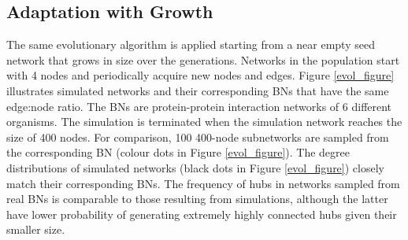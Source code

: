 \subsection{Adaptation with Growth}\label{evolution_results}
	The same evolutionary algorithm is applied starting from a near empty seed network that grows in size
	over the generations. Networks in the population start with 4 nodes and periodically acquire new nodes 
	and edges. Figure \ref{evol_figure} illustrates simulated networks and their corresponding
	BNs that have the same edge:node ratio. The BNs are protein-protein interaction networks of 6 different organisms. The simulation is terminated when the simulation network
	reaches the size of 400 nodes. For comparison, 
	 100 400-node subnetworks are sampled from the corresponding BN (colour dots in Figure \ref{evol_figure}). 
	 The degree distributions of simulated networks (black dots in Figure \ref{evol_figure})
	closely match their corresponding BNs. 
	The frequency of hubs in  networks sampled from real BNs is comparable to those resulting from simulations, although the latter have lower probability of generating
	extremely highly connected hubs given their smaller size.  
\begin{comment}
Fitness is based on a leaf metric that emphasizes sparsely connected nodes and a hub metric that promotes highly connected nodes. Fitness is the product of these two forces, which stretch the degree distribution in both directions to exhibit heavy-tailed connectivity. 

$f(N)=LF \times HF$

The leaf metric is based on minimizing the correlation between benefits and damages. Previous work demonstrates that higher correlation between values and weights result in more computationally expensive knapsack problems \cite{pisinger_where_2005}. Nodes are evaluated based on the ratio of benefits to all interactions (benefits + damages). The symmetrical case of damages to all interactions is also considered, and the higher outcome is preferred. Lower degree nodes are far more likely to be uncorrelated. The ratio alone vastly prefers degree one, so the square root of the ratio is taken to create smoother spectrum. The total leaf fitness is the average of the fitness of all nodes. 

$LF = \frac { |\{g_i: b_i = 0 | d_i=0\}| }  {|G|}$

The hub metric captures the ability to garner more benefits with less change. The benefits of the nodes in solution to the NEP is transformed from a multi set to a single set, which removes redundant numbers. The hub metric is composed of the sum of the single set of the benefits in the solution, divided by the sum of the multi set of benefits in the solution. Since the solution tends to include many small elements, the metric evaluates the proportion of the solution that is due to large, infrequent elements.

$HF = \frac { |\{g_i: b_i = 0 | d_i=0\}| }  {\sum\limits_{i=1}^{n} b_i}$
\end{comment}
